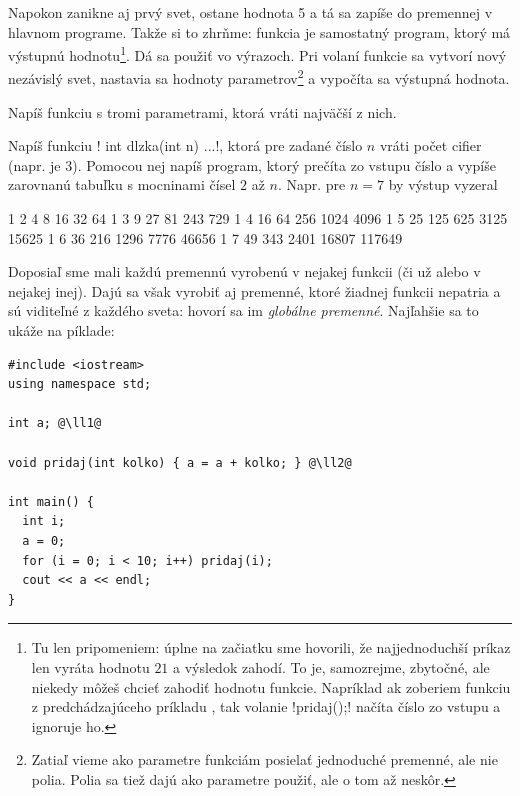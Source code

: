 Napokon zanikne aj prvý svet, ostane hodnota 5 a tá sa zapíše do premennej 
v hlavnom programe. Takže si to zhrňme: funkcia je samostatný program, ktorý má 
výstupnú hodnotu\footnote{Tu len pripomeniem: úplne na začiatku sme hovorili,
že najjednoduchší príkaz  len vyráta hodnotu $21$ a výsledok zahodí. 
To je, samozrejme, zbytočné, ale niekedy môžeš chcieť zahodiť hodnotu funkcie. Napríklad
ak zoberiem funkciu  z predchádzajúceho príkladu , tak
volanie \prg!pridaj();! načíta číslo zo vstupu a 
ignoruje ho.}.
Dá sa použiť vo výrazoch. Pri volaní funkcie sa vytvorí
nový nezávislý svet, nastavia sa hodnoty parametrov\footnote{%
Zatiaľ vieme ako parametre funkciám posielať jednoduché premenné, ale nie polia. 
Polia sa tiež dajú ako parametre použiť, ale o tom až neskôr.
} a vypočíta sa výstupná hodnota.

\begin{uloha}
  Napíš funkciu  s tromi parametrami, ktorá vráti najväčší z nich.
\end{uloha}

\begin{uloha}
  Napíš funkciu \prg! int dlzka(int n) {...}!, ktorá pre zadané číslo $n$
  vráti počet cifier (napr.  je 3). Pomocou nej napíš program,
  ktorý prečíta zo vstupu číslo  a vypíše zarovnanú tabuľku s 
  mocninami čísel $2$ až $n$. Napr. pre $n=7$ by výstup vyzeral

\begin{outputBox}
      1      2      4      8     16     32     64
      1      3      9     27     81    243    729
      1      4     16     64    256   1024   4096
      1      5     25    125    625   3125  15625
      1      6     36    216   1296   7776  46656
      1      7     49    343   2401  16807 117649
\end{outputBox}
\end{uloha}


Doposiaľ sme mali každú premennú vyrobenú v nejakej funkcii (či už  alebo 
v nejakej inej). Dajú sa však vyrobiť aj premenné, ktoré žiadnej funkcii nepatria
a sú viditeľné z každého sveta: hovorí sa im {\em globálne premenné}. Najľahšie
sa to ukáže na píklade:

\begin{lstlisting}[label=funkcie.0] 
#include <iostream>
using namespace std;

int a; @\ll1@

void pridaj(int kolko) { a = a + kolko; } @\ll2@

int main() {
  int i;
  a = 0;
  for (i = 0; i < 10; i++) pridaj(i);
  cout << a << endl;
}
\end{lstlisting}


